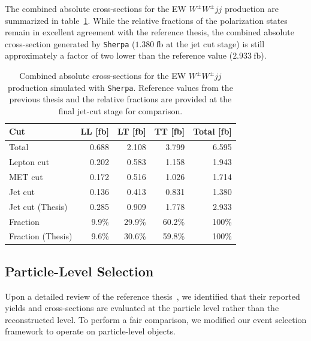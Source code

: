\documentclass[12pt]{article}
\begin{document}
        The combined absolute cross-sections for the EW $W^{\pm}W^{\pm}jj$ production are summarized in table~\ref{tab:sherpa_WWjj_cross_section}. While the relative fractions of the polarization states remain in excellent agreement with the reference thesis, the combined absolute cross-section generated by \verb|Sherpa| ($1.380~\text{fb}$ at the jet cut stage) is still approximately a factor of two lower than the reference value ($2.933~\text{fb}$).
        \begin{table}[htpb]
            \centering
            \caption{Combined absolute cross-sections for the EW $W^{\pm}W^{\pm}jj$ production simulated with \texttt{Sherpa}. Reference values from the previous thesis and the relative fractions are provided at the final jet-cut stage for comparison.}
            \label{tab:sherpa_WWjj_cross_section}
            \begin{tabular}{l|rrrr}
                Cut               & LL [fb] & LT [fb] & TT [fb] & Total [fb] \\ \hline
                Total             & 0.688   & 2.108   & 3.799   & 6.595      \\
                Lepton cut        & 0.202   & 0.583   & 1.158   & 1.943      \\
                MET cut           & 0.172   & 0.516   & 1.026   & 1.714      \\
                Jet cut           & 0.136   & 0.413   & 0.831   & 1.380      \\ \hline
                Jet cut (Thesis)  & 0.285   & 0.909   & 1.778   & 2.933      \\ \hline
                Fraction          & 9.9\%   & 29.9\%  & 60.2\%  & 100\%      \\
                Fraction (Thesis) & 9.6\%   & 30.6\%  & 59.8\%  & 100\%
            \end{tabular}
        \end{table}


    \subsection{Particle-Level Selection}%
    \label{sub:particle_level_selection}

        Upon a detailed review of the reference thesis~\cite{stange2025longitudinal}, we identified that their reported yields and cross-sections are evaluated at the particle level rather than the reconstructed level. To perform a fair comparison, we modified our event selection framework to operate on particle-level objects.
\end{document}
